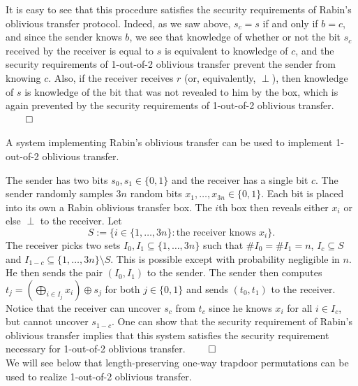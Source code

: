 It is easy to see that this procedure satisfies the security requirements of Rabin's oblivious transfer protocol. Indeed, as we saw above, $s_c = s$ if and only if $b = c$, and since the sender knows $b$, we see that knowledge of whether or not the bit $s_c$ received by the receiver is equal to $s$ is equivalent to knowledge of $c$, and the security requirements of 1-out-of-2 oblivious transfer prevent the sender from knowing $c$. Also, if the receiver receives $r$ (or, equivalently, $\perp$), then knowledge of $s$ is knowledge of the bit that was not revealed to him by the box, which is again prevented by the security requirements of 1-out-of-2 oblivious transfer.  $\qed$

\begin{lemma}
A system implementing Rabin's oblivious transfer can be used to implement 1-out-of-2 oblivious transfer.
\end{lemma}

\proofsketch
The sender has two bits $s_0, s_1 \in \{0,1\}$ and the receiver has a single bit $c$. The sender randomly samples $3n$ random bits $x_1, \dotsc, x_{3n} \in \{0,1\}$. Each bit is placed into its own a Rabin oblivious transfer box. The $i$th box then reveals either $x_i$ or else $\perp$ to the receiver. Let 
\[ S := \{i \in \{1, \dotsc, 3n\} : \text{the receiver knows } x_i\}. \]
The receiver picks two sets $I_0, I_1 \subseteq \{1, \dotsc, 3n\}$ such that $\# I_0 = \# I_1 = n$, $I_c \subseteq S$ and $I_{1-c} \subseteq \{1, \dotsc, 3n\} \setminus S$. This is possible except with probability negligible in $n$. He then sends the pair $(I_0, I_1)$ to the sender. The sender then computes $t_j= \left(\bigoplus_{i \in I_j}x_i \right) \oplus s_j$ for both $j \in \{0,1\}$ and sends $(t_0, t_1)$ to the receiver. \\

Notice that the receiver can uncover $s_c$ from $t_c$ since he knows $x_i$ for all $i \in I_c$, but cannot uncover $s_{1-c}$. One can show that the security requirement of Rabin's oblivious transfer implies that this system satisfies the security requirement necessary for 1-out-of-2 oblivious transfer. $\qed$ \\

We will see below that length-preserving one-way trapdoor permutations can be used to realize 1-out-of-2 oblivious transfer. 

